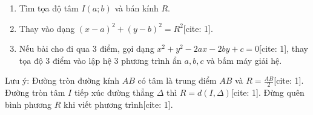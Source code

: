 \begin{enumerate}
\item Tìm tọa độ tâm $I(a; b)$ và bán kính $R$.
\item Thay vào dạng $(x-a)^2 + (y-b)^2 = R^2$[cite: 1].
\item Nếu bài cho đi qua $3$ điểm, gọi dạng $x^2 + y^2 - 2ax - 2by + c = 0$[cite: 1], thay tọa độ $3$ điểm vào lập hệ $3$ phương trình ẩn $a, b, c$ và bấm máy giải hệ.
\end{enumerate}
Lưu ý: Đường tròn đường kính $AB$ có tâm là trung điểm $AB$ và $R = \frac{AB}{2}$[cite: 1]. Đường tròn tâm $I$ tiếp xúc đường thẳng $\Delta$ thì $R = d(I, \Delta)$[cite: 1]. Đừng quên bình phương $R$ khi viết phương trình[cite: 1].
